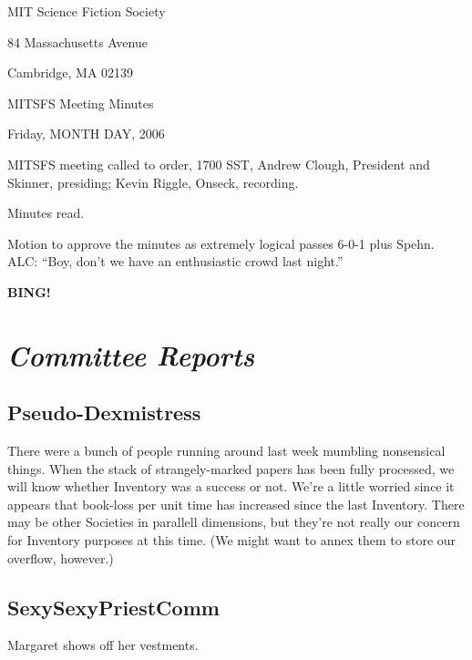 \documentclass[10pt]{article}
\newcommand{\bing}{{\bf BING!} }
\newcommand{\goto}[1]{\bing \vskip 12pt \section*{{\em{#1}}}}
\newcommand{\ps}{ plus Spehn\xspace}
\begin{document}
\begin{center}

MIT Science Fiction Society

84 Massachusetts Avenue

Cambridge, MA 02139

\vspace{12pt}

MITSFS Meeting Minutes

Friday, MONTH DAY, 2006

\end{center}

\vspace{18pt}

\setlength{\parskip}{6pt}

\noindent
MITSFS meeting called to order, 1700 SST,
Andrew Clough, President and Skinner, presiding; Kevin Riggle, Onseck, recording.

Minutes read.

Motion to approve the minutes as extremely logical passes 6-0-1\ps.  ALC: ``Boy, don't we have an
enthusiastic crowd last night.''

\goto{Committee Reports}

\subsection*{Pseudo-Dexmistress}
There were a bunch of people running around last week mumbling nonsensical things.  When the stack
of strangely-marked papers has been fully processed, we will know whether Inventory was a success
or not.  We're a little worried since it appears that book-loss per unit time has increased since
the last Inventory.  There may be other Societies in parallell dimensions, but they're not really
our concern for Inventory purposes at this time.  (We might want to annex them to store our 
overflow, however.)

\subsection*{SexySexyPriestComm}
Margaret shows off her vestments.


\end{document}
